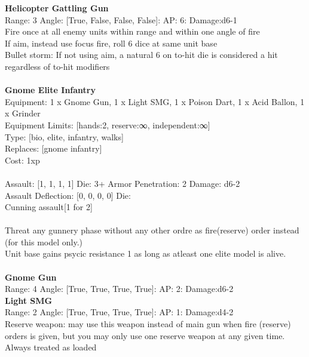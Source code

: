 {\bf Helicopter Gattling Gun } \\



Range: 3  Angle: [True, False, False, False]: AP: 6: Damage:d6-1 \\
Fire once at all enemy units within range and within one angle of fire\\ 
If aim, instead use focus fire, roll 6 dice at same unit base\\ 
Bullet storm: If not using aim, a natural 6 on to-hit die is considered a hit regardless of to-hit modifiers\\ 




 
\ \\

{\bf Gnome Elite Infantry } \\
Equipment: 1 x Gnome Gun, 1 x Light SMG, 1 x Poison Dart, 1 x Acid Ballon, 1 x Grinder \\
Equipment Limits: [hands:2, reserve:∞, independent:∞] \\
Type: [bio, elite, infantry, walks] \\
Replaces: [gnome infantry] \\
Cost: 1xp\\
\ \\
Assault: [1, 1, 1, 1] Die: 3+ Armor Penetration: 2 Damage: d6-2 \\
Assault Deflection: [0, 0, 0, 0] Die: \\
\indent Cunning assault[1 for 2]\\ 
 
\ \\
Threat any gunnery phase without any other ordre as fire(reserve) order instead (for this model only.)\\ 
Unit base gains psycic resistance 1 as long as atleast one elite model is alive.\\ 

\ \\
{\bf Gnome Gun } \\



Range: 4  Angle: [True, True, True, True]: AP: 2: Damage:d6-2 \\




{\bf Light SMG } \\



Range: 2  Angle: [True, True, True, True]: AP: 1: Damage:d4-2 \\
Reserve weapon: may use this weapon instead of main gun when fire (reserve) orders is given, but you may only use one reserve weapon at any given time.\\ 
Always treated as loaded\\ 




